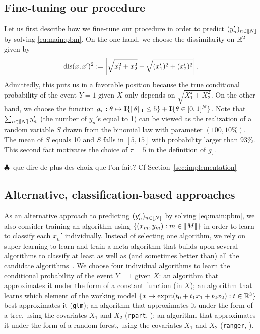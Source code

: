 \subsection{Fine-tuning our procedure}

Let  us first  describe how  we fine-tune  our procedure  in order  to predict
$(y_{n}')_{n \in \llbracket  N\rrbracket}$ by solving \eqref{eq:main:pbm}. On  the one hand,
we choose the dissimilarity on $\mathbb{R}^{2}$ given by
\begin{equation*}
  \operatorname{dis}(x,x')^{2}:= \left|\sqrt{x_{1}^{2} + x_{2}^{2}} - \sqrt{(x_{1}')^{2} + 
      (x_{2}')^{2}}\right|.
\end{equation*}
Admittedly, this puts us in a  favorable position because the true conditional
probability   of    the   event    $Y=1$   given    $X$   only    depends   on
$\sqrt{X_{1}^{2} +  X_{2}^{2}}$.  On  the other hand,  we choose  the function
$g_{\tau}  : \theta  \mapsto \textbf{I}\{\|\theta\|_{1}  \leq 5\}  + \textbf{I}\{\theta  \in
[0,1]^{N}\}$.   Note  that $\sum_{n  \in  \llbracket  N\rrbracket}  y_{n}'$ (the  number  of
$y_{n}'$s equal to  1) can be viewed  as the realization of  a random variable
$S$ drawn from the binomial law with  parameter $(100, 10\%)$. The mean of $S$
equals 10 and $S$ falls in $[5, 15]$ with probability larger than $93\%$. This
second fact motivates the choice of $\tau=5$ in the definition of $g_{\tau}$.

$\clubsuit$~que   dire    de   plus   des    choix   que   l'on    fait?    Cf
Section~\ref{sec:implementation}

\subsection{Alternative, classification-based approaches}

As  an alternative  approach  to  predicting $(y_{n}')_{n  \in  \llbracket N\rrbracket}$  by
solving  \eqref{eq:main:pbm}, we  also  consider training  an algorithm  using
$\{(x_{m}, y_{m})  : m  \in \llbracket  M\rrbracket\}$ in  order to  learn to  classify each
$x_{n}'$ individually.  Instead  of selecting one algorithm, we  rely on super
learning  to  learn  and  train  a meta-algorithm  that  builds  upon  several
algorithms to classify at least as well as (and sometimes better than) all the
candidate                   algorithms~\citep[and                   references
therein]{SL2007,SuperLearner,SLchapter}. We choose  four individual algorithms
to  learn  the conditional  probability  of  the  event  $Y=1$ given  $X$:  an
algorithm that approximates it under the form of a constant function (in $X$);
an   algorithm   that   learns   which    element   of   the   working   model
$\{x \mapsto  \operatorname{expit}(t_{0} + t_{1}  x_{1} + t_{2}  x_{2}) : t  \in \mathbb{R}^{3}\}$
best approximates it  (\texttt{glm}); an algorithm that  approximates it under
the form of a tree, using  the covariates $X_{1}$ and $X_{2}$ (\texttt{rpart},
\citet{rpart}); an algorithm  that approximates it under the form  of a random
forest,   using  the   covariates   $X_{1}$   and  $X_{2}$   (\texttt{ranger},
\citet{ranger}). 


